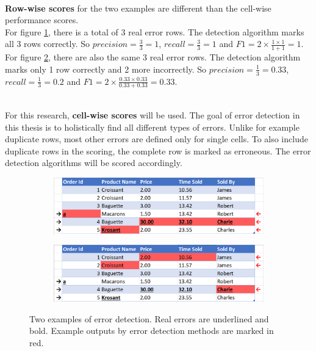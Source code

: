 ~\\\textbf{Row-wise scores} for the two examples are different than the cell-wise performance scores.
\\For figure \ref{subfig:errors_row}, there is a total of 3 real error rows. The detection algorithm marks all 3 rows correctly. So $precision = \frac{3}{3} = 1$, $recall = \frac{3}{3} = 1$ and $F1 = 2 \times \frac{1 \times 1}{1 + 1} = 1$. 
\\For figure \ref{subfig:errors_row_worse}, there are also the same 3 real error rows. The detection algorithm marks only 1 row correctly and 2 more incorrectly. So $precision = \frac{1}{3} = 0.33$, $recall = \frac{1}{3} = 0.2$ and $F1 = 2 \times \frac{0.33 \times 0.33}{0.33 + 0.33} = 0.33$. 

~\\For this research, \textbf{cell-wise scores} will be used. The goal of error detection in this thesis is to holistically find all different types of errors. Unlike for example duplicate rows, most other errors are defined only for single cells. To also include duplicate rows in the scoring, the complete row is marked as erroneous. The error detection algorithms will be scored accordingly.

\begin{figure}
\centering
    \begin{subfigure}{0.9\textwidth}
        \includegraphics[width=\linewidth]{thesis/Figures/Method/Errors_dataset_F1_row.png}
        \caption{}
        \label{subfig:errors_row}
    \end{subfigure}
    \begin{subfigure}{0.9\textwidth}
        \includegraphics[width=\linewidth]{thesis/Figures/Method/Errors_dataset_Worse_F1_row.png}
        \caption{}
        \label{subfig:errors_row_worse}
    \end{subfigure}
    \caption{Two examples of error detection. Real errors are underlined and bold. Example outputs by error detection methods are marked in red.}
    \label{fig:error_row_wise}
\end{figure}

